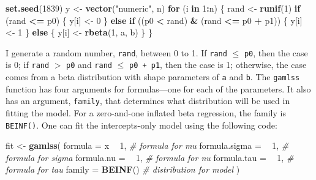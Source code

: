 \documentclass[english,man]{apa6}
\newenvironment{Shaded}{\begin{snugshade}}{\end{snugshade}}
\newcommand{\KeywordTok}[1]{\textcolor[rgb]{0.13,0.29,0.53}{\textbf{#1}}}
\newcommand{\DataTypeTok}[1]{\textcolor[rgb]{0.13,0.29,0.53}{#1}}
\newcommand{\DecValTok}[1]{\textcolor[rgb]{0.00,0.00,0.81}{#1}}
\newcommand{\StringTok}[1]{\textcolor[rgb]{0.31,0.60,0.02}{#1}}
\newcommand{\CommentTok}[1]{\textcolor[rgb]{0.56,0.35,0.01}{\textit{#1}}}
\newcommand{\ControlFlowTok}[1]{\textcolor[rgb]{0.13,0.29,0.53}{\textbf{#1}}}
\newcommand{\OperatorTok}[1]{\textcolor[rgb]{0.81,0.36,0.00}{\textbf{#1}}}
\newcommand{\NormalTok}[1]{#1}
\theoremstyle{definition}
\theoremstyle{definition}
\theoremstyle{remark}
\begin{document}
\begin{Shaded}
\begin{Highlighting}[]
\KeywordTok{set.seed}\NormalTok{(}\DecValTok{1839}\NormalTok{)}
\NormalTok{y <-}\StringTok{ }\KeywordTok{vector}\NormalTok{(}\StringTok{"numeric"}\NormalTok{, n)}
\ControlFlowTok{for}\NormalTok{ (i }\ControlFlowTok{in} \DecValTok{1}\OperatorTok{:}\NormalTok{n) \{}
\NormalTok{  rand <-}\StringTok{ }\KeywordTok{runif}\NormalTok{(}\DecValTok{1}\NormalTok{)}
  \ControlFlowTok{if}\NormalTok{ (rand }\OperatorTok{<=}\StringTok{ }\NormalTok{p0) \{}
\NormalTok{    y[i] <-}\StringTok{ }\DecValTok{0}
\NormalTok{  \} }\ControlFlowTok{else} \ControlFlowTok{if}\NormalTok{ ((p0 }\OperatorTok{<}\StringTok{ }\NormalTok{rand) }\OperatorTok{&}\StringTok{ }\NormalTok{(rand }\OperatorTok{<=}\StringTok{ }\NormalTok{p0 }\OperatorTok{+}\StringTok{ }\NormalTok{p1)) \{}
\NormalTok{    y[i] <-}\StringTok{ }\DecValTok{1}
\NormalTok{  \} }\ControlFlowTok{else}\NormalTok{ \{}
\NormalTok{    y[i] <-}\StringTok{ }\KeywordTok{rbeta}\NormalTok{(}\DecValTok{1}\NormalTok{, a, b)}
\NormalTok{  \}}
\NormalTok{\}}
\end{Highlighting}
\end{Shaded}

I generate a random number, \texttt{rand}, between 0 to 1. If
\texttt{rand} \(\leq\) \texttt{p0}, then the case is 0; if \texttt{rand}
\(>\) \texttt{p0} and \texttt{rand} \(\leq\) \texttt{p0\ +\ p1}, then
the case is 1; otherwise, the case comes from a beta distribution with
shape parameters of \texttt{a} and \texttt{b}. The \texttt{gamlss}
function has four arguments for formulas---one for each of the
parameters. It also has an argument, \texttt{family}, that determines
what distribution will be used in fitting the model. For a zero-and-one
inflated beta regression, the family is \texttt{BEINF()}. One can fit
the intercepts-only model using the following code:

\begin{Shaded}
\begin{Highlighting}[]
\NormalTok{fit <-}\StringTok{ }\KeywordTok{gamlss}\NormalTok{(}
  \DataTypeTok{formula =}\NormalTok{ x }\OperatorTok{~}\StringTok{ }\DecValTok{1}\NormalTok{, }\CommentTok{# formula for mu}
  \DataTypeTok{formula.sigma =} \OperatorTok{~}\StringTok{ }\DecValTok{1}\NormalTok{, }\CommentTok{# formula for sigma}
  \DataTypeTok{formula.nu =} \OperatorTok{~}\StringTok{ }\DecValTok{1}\NormalTok{, }\CommentTok{# formula for nu}
  \DataTypeTok{formula.tau =} \OperatorTok{~}\StringTok{ }\DecValTok{1}\NormalTok{, }\CommentTok{# formula for tau}
  \DataTypeTok{family =} \KeywordTok{BEINF}\NormalTok{() }\CommentTok{# distribution for model}
\NormalTok{)}
\end{Highlighting}
\end{Shaded}
\end{document}

